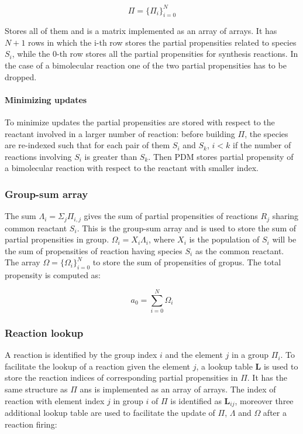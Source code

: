     $$\Pi = \{\Pi_i\}_{i=0}^N$$

    Stores all of them and is a matrix implemented as an array of arrays.
    It has $N+1$ rows in which the i-th row stores the partial propensities related to species $S_i$, while the 0-th row stores all the partial propensities for synthesis reactions.
    In the case of a bimolecular reaction one of the two partial propensities has to be dropped.

      \paragraph{Minimizing updates}
      To minimize updates the partial propensities are stored with respect to the reactant involved in a larger number of reaction: before building $\Pi$, the species are re-indexed such that for each pair of them $S_i$ and $S_k$, $i<k$ if the number of reactions involving $S_i$ is greater than $S_k$.
      Then PDM stores partial propensity of a bimolecular reaction with respect to the reactant with smaller index.

    \subsubsection{Group-sum array}
    The sum $\Lambda_i = \Sigma_j\Pi_{i,j}$ gives the sum of partial propensities of reactions $R_j$ sharing common reactant $S_i$.
    This is the group-sum array and is used to store the sum of partial propensities in group.
    $\Omega_i = X_i\Lambda_i$, where $X_i$ is the population of $S_i$ will be the sum of propensities of reaction having species $S_i$ as the common reactant.
    The array $\Omega = \{\Omega_i\}_{i=0}^N$ to store the sum of propensities of gropus.
    The total propensity is computed as:

    $$a_0 = \sum\limits_{i=0}^N\Omega_i$$

    \subsubsection{Reaction lookup}
    A reaction is identified by the group index $i$ and the element $j$ in a group $\Pi_i$.
    To facilitate the lookup of a reaction given the element $j$, a lookup table $\mathbf{L}$ is used to store the reaction indices of corresponding partial propensities in $\Pi$.
    It has the same structure as $\Pi$ ans is implemented as an array of arrays.
    The index of reaction with element index $j$ in group $i$ of $\Pi$ is identified as $\mathbf{L}_{ij}$, moreover three additional lookup table are used to facilitate the update of $\Pi$, $\Lambda$ and $\Omega$ after a reaction firing:

